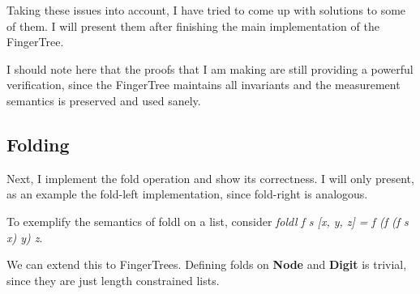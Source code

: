 \documentclass[12pt,twoside,notitlepage]{report}
\begin{document}
Taking these issues into account, I have tried to come up with solutions to some of them. I will present them after finishing the main implementation of the FingerTree.

I should note here that the proofs that I am making are still providing a powerful verification, since the FingerTree maintains all invariants and the measurement semantics is preserved and used sanely.

\subsection{Folding}
\label{sec:fold}

Next, I implement the fold operation and show its correctness. I will only present, as an example the fold-left implementation, since fold-right is analogous.

To exemplify the semantics of foldl on a list, consider \textit{foldl f s [x, y, z] = f (f (f s x) y) z}. 

We can extend this to FingerTrees. Defining folds on \textbf{Node} and \textbf{Digit} is trivial, since they are just length constrained lists. 
\end{document}
